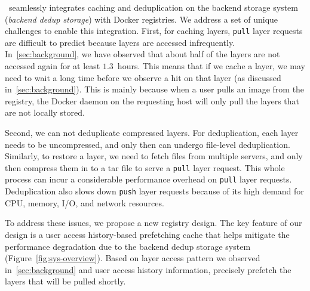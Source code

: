 \sysname~seamlessly integrates 
caching and deduplication on the
backend storage system (\emph{backend dedup storage}) with Docker registries.
%
We address a set of unique challenges to enable this integration.
%
First, for caching layers, \texttt{pull} layer requests are difficult to
predict because layers are accessed infrequently.
In~\cref{sec:background},
we have observed that about half of the layers are not
accessed again for at least $1.3$~hours. This means that if we
cache a layer, we may need to wait a long time before we observe a hit on that layer (as discussed in~\cref{sec:background}).  
This is mainly 
because when a user pulls an image from the registry, the Docker daemon on the
requesting host will only pull the layers that are not locally stored.
%

Second, we can not deduplicate compressed layers. For deduplication, each layer
needs to be uncompressed, and only then can undergo file-level deduplication. Similarly,
to restore a layer, we need to fetch files from multiple servers, and only then compress
them in to a tar file to serve a \texttt{pull} layer request. 
This whole process can incur a 
considerable performance overhead on \texttt{pull} layer requests.
Deduplication also slows down
\texttt{push} layer requests because of its high demand for CPU, memory, I/O, and network resources.

To address these issues, we propose a new registry design. The key feature of our design is a user access history-based prefetching cache that helps mitigate the performance degradation due to the 
backend dedup storage system (Figure~\ref{fig:sys-overview}). Based
on layer access pattern we observed in~\cref{sec:background} and user access history information,
\sysname precisely prefetch the layers that will be pulled shortly.

